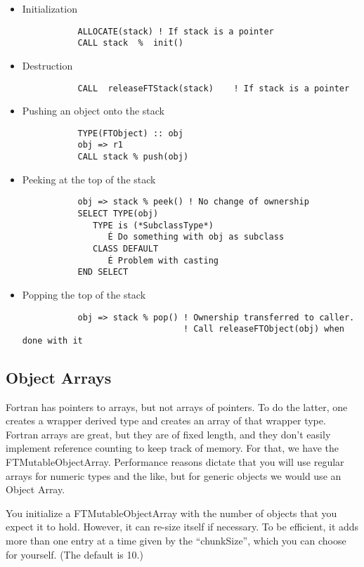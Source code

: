 \documentclass[9pt]{article}
\begin{document}
\begin{itemize}
        \item Initialization
	{\color{blue}\begin{verbatim}
           ALLOCATE(stack) ! If stack is a pointer
           CALL stack  %  init()
	\end{verbatim}}
        \item Destruction
	{\color{blue}\begin{verbatim}
           CALL  releaseFTStack(stack)    ! If stack is a pointer
	\end{verbatim}}
        \item Pushing an object onto the stack

	{\color{blue}\begin{verbatim}
           TYPE(FTObject) :: obj
           obj => r1
           CALL stack % push(obj)
	\end{verbatim}}
        \item Peeking at the top of the stack
	{\color{blue}
	\begin{verbatim}
           obj => stack % peek() ! No change of ownership
           SELECT TYPE(obj)
              TYPE is (*SubclassType*)
                 É Do something with obj as subclass
              CLASS DEFAULT
                 É Problem with casting
           END SELECT
	\end{verbatim}
	}
        \item Popping the top of the stack
	{\color{blue}\begin{verbatim}
           obj => stack % pop() ! Ownership transferred to caller.
                                ! Call releaseFTObject(obj) when done with it
	\end{verbatim}}
\end{itemize}
\subsection{Object Arrays}
Fortran has pointers to arrays, but not arrays of pointers. To do the latter, one creates
a wrapper derived type and creates an array of that wrapper type. Fortran arrays are great, but
they are of fixed length, and they don't easily implement reference counting to keep track of
memory. For that, we have the FTMutableObjectArray. Performance reasons dictate that you 
will use regular arrays for numeric types and the like, but for generic objects we would use
an Object Array.

You initialize a FTMutableObjectArray with the number of objects that you expect it to hold.
However, it can re-size itself if necessary. To be efficient, it adds more than one entry at a time
given by the ``chunkSize'', which you can choose for yourself. (The default is 10.)
\end{document}
